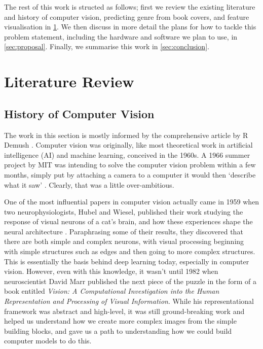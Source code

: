 \documentclass[12pt]{article}
\numberwithin{equation}{section}
\numberwithin{figure}{section}
\begin{document}
The rest of this work is structed as follows; first we review the existing literature and history of computer vision, predicting genre from book covers, and feature visualisation in \cref{sec:lit_rev}. We then discuss in more detail the plans for how to tackle this problem statement, including the hardware and software we plan to use, in \cref{sec:proposal}. Finally, we summarise this work in \cref{sec:conclusion}.
\section{Literature Review} %
\label{sec:lit_rev}

\subsection{History of Computer Vision}
\label{sec:computer_vision}
The work in this section is mostly informed by the comprehensive article by R Demush \cite{Demush}. Computer vision was originally, like most theoretical work in artificial intelligence (AI) and machine learning, conceived in the 1960s. A 1966 summer project by MIT was intending to solve the computer vision problem within a few months, simply put by attaching a camera to a computer it would then `describe what it saw' \cite{Papert1966}. Clearly, that was a little over-ambitious. 

One of the most influential papers in computer vision actually came in 1959 when two neurophysiologists, Hubel and Wiesel, published their work studying the response of visual neurons of a cat's brain, and how these experiences shape the neural architecture \cite{Hubel1959}. Paraphrasing some of their results, they discovered that there are both simple and complex neurons, with visual processing beginning with simple structures such as edges and then going to more complex structures. This is essentially the basis behind deep learning today, especially in computer vision. However, even with this knowledge, it wasn't until 1982 when neuroscientist David Marr published the next piece of the puzzle in the form of a book entitled \emph{Vision: A Computational Investigation into the Human Representation and Processing of Visual Information}\cite{Marr:1982:VCI:1095712}. While his representational framework was abstract and high-level, it was still ground-breaking work and helped us understand how we create more complex images from the simple building blocks, and gave us a path to understanding how we could build computer models to do this.
\end{document}
